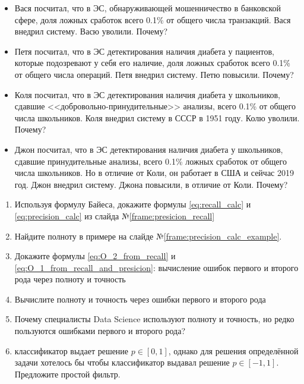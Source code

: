   \begin{frame}
  \small
  \begin{itemize}
  	\item Вася посчитал, что в ЭС, обнаруживающей мошенничество в банковской сфере,
  	доля ложных сработок всего 0.1\% от общего числа транзакций. 
  	Вася внедрил систему. Васю уволили. Почему?
  	\item Петя посчитал, что в ЭС детектирования наличия диабета у пациентов,
  	которые подозревают у себя его наличие, 
  	доля ложных сработок всего 0.1\% от общего числа операций.
  	Петя внедрил систему. Петю повысили. Почему?
  	\item Коля посчитал, что в ЭС детектирования наличия диабета у 
  	школьников, сдавшие <<добровольно-принудительные>> анализы, 
  	всего 0.1\% от общего числа школьников. Коля внедрил систему в СССР в 1951 году. Колю уволили. Почему?
  	\item Джон посчитал, что в ЭС детектирования наличия диабета у 
  	школьников, сдавшие принудительные анализы, 
  	всего 0.1\% ложных сработок от общего числа школьников. 
  	Но в отличие от Коли, он работает в США и сейчас 2019 год. 
  	Джон внедрил систему. Джона повысили, в отличие от Коли. Почему?
  \end{itemize}

  \end{frame}
  
\begin{frame}
  \begin{enumerate}
    \item Используя формулу Байеса, докажите формулы \eqref{eq:recall_calc} и \eqref{eq:precision_calc} из слайда №\ref{frame:presicion_recall}
    \item Найдите полноту в примере на слайде №\ref{frame:precision_calc_example}.
    
   
   \item Докажите формулы \eqref{eq:O_2_from_recall}
     и
     \eqref{eq:O_1_from_recall_and_presicion}:
     вычисление ошибок первого и второго рода 
     через полноту и точность
  
   \item Вычислите полноту и точность через ошибки первого и второго рода
  
   \item Почему специалисты Data Science используют полноту и точность, 
  но редко пользуются ошибками первого и второго рода?
  
      \item классификатор выдает решение $p \in [0, 1]$, однако для решения
      определённой задачи хотелось бы чтобы классификатор выдавал решение $p \in [-1, 1]$.
      Предложите простой фильтр.
  \end{enumerate}   
\end{frame}

